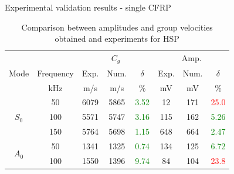 \documentclass[10pt]{beamer} %
\begin{document}
	\begin{frame}[label=frame14]{Experimental validation results - single CFRP}

		\begin{table}

			\centering

			\caption{\label{tab:group_velocity_cfrp} Comparison between amplitudes and group velocities  obtained and experiments for HSP}
			\begin{tabular}{cccccccc}

				\toprule

				& & \multicolumn{3}{c}{\(C_g\)} & \multicolumn{3}{c}{Amp.}\\

				Mode & Frequency & Exp. & Num. & \(\delta\)& Exp. & Num. & \(\delta\)\\

				& kHz & m/s & m/s & \% & mV & mV & \% \\

				\midrule

				\multirow{3}{*}{$S_0$} & 50 & 6079 & 5865 & \textcolor{green}{3.52}& 12 & 171 & \textcolor{red}{25.0} \\

				&100& 5571 & 5747 & \textcolor{green}{3.16} & 115 & 162 & \textcolor{green}{5.26}\\

				&150& 5764 & 5698 & \textcolor{green}{1.15} & 648 & 664 & \textcolor{green}{2.47}\\

				\midrule

				\multirow{3}{*}{$A_0$} &50& 1341 & 1325 & \textcolor{green}{0.74} & 134 & 125 & \textcolor{green}{6.72}\\

				&100& 1550 & 1396 & \textcolor{green}{9.74} & 84 & 104 & \textcolor{red}{23.8}\\
				\bottomrule

			\end{tabular}

		\end{table}

	\end{frame}
\end{document}
